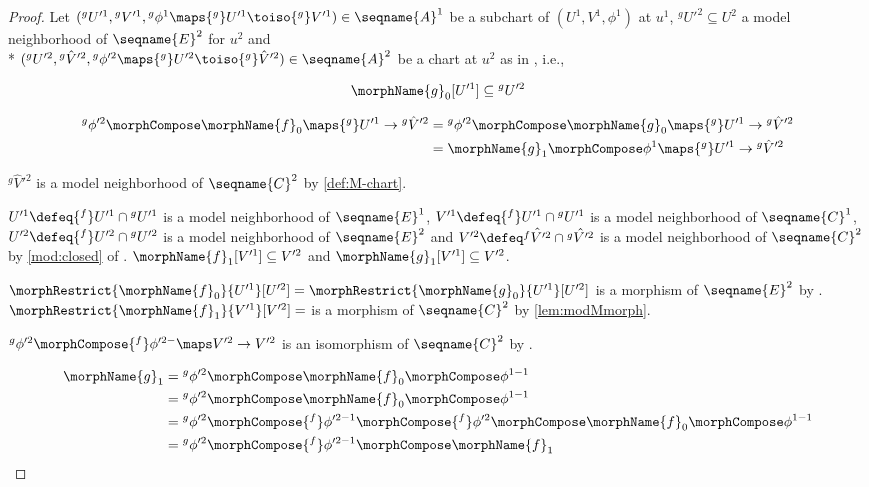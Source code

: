 \documentclass{article}
\begin{document}
\begin{lemma}
\begin{proof}
Let
$
  ({^g}U'^1, {^g}V'^1, {^g}\phi^1 \maps {^g}U'^1 \toiso {^g}V'^1)
  \in \seqname{A}^1
$
be a subchart of $(U^1,V^1,\phi^1)$ at $u^1$,
${^g}U'^2 \subseteq U^2$ a model neighborhood of $\seqname{E}^2$ for
$u^2$ and \\*
$
  ({^g}U'^2 ,{^g}\hat{V}'^2, {^g}\phi'^2 \maps {^g}U'^2 \toiso {^g}\hat{V}'^2)
  \in \seqname{A}^2
$
be a chart at $u^2$  as in , i.e.,

\begin{equation}
\morphName{g}_0[U'^1] \subseteq {^g}U'^2
\end{equation}

\begin{equation}
\begin{split}
  {^g}\phi'^2 \morphCompose \morphName{f}_0 \maps {^g}U'^1 \to {^g}\hat{V}'^2
  & =
  {^g}\phi'^2 \morphCompose \morphName{g}_0 \maps {^g}U'^1 \to {^g}\hat{V}'^2
\\*
  & =
  \morphName{g}_1 \morphCompose \phi^1 \maps {^g}U'^1 \to {^g}\hat{V}'^2
\end{split}
\end{equation}

${^g}\hat{V}'^2$ is a model neighborhood of
$\seqname{C}^2$ by \cref{def:M-chart}.

\nobreaks
  {{
    $U'^1 \defeq {^f}U'^1 \cap {^g}U'^1$
  }}
is a model neighborhood of $\seqname{E}^1$,
\nobreaks
  {{
    $V'^1 \defeq {^f}U'^1 \cap {^g}U'^1$
  }}
is a model neighborhood of $\seqname{C}^1$,
\nobreaks
  {{
    $U'^2 \defeq {^f}U'^2 \cap {^g}U'^2$
  }}
is a model neighborhood of $\seqname{E}^2$ and
\nobreaks
  {{
    $V'^2 \defeq \hat{^{f}V'^2} \cap \hat{^{g}V'^2}$
  }}
is a model neighborhood of $\seqname{C}^2$ by
{
  \showlabelsinline
  \cref{mod:closed}
}
of .
$\morphName{f}_1[V'^1] \subseteq V'^2$ and
$\morphName{g}_1[V'^1] \subseteq V'^2$.

$
  \morphRestrict{\morphName{f}_0}{U'^1}[U'^2] =
  \morphRestrict{\morphName{g}_0}{U'^1}[U'^2]
$
is a morphism of $\seqname{E}^2$ by .
$
  \morphRestrict{\morphName{f}_1}{V'^1}[V'^2] =
$
is a morphism of $\seqname{C}^2$ by \cref{lem:modMmorph}.

${^g}\phi'^2 \morphCompose {^f}\phi'^{2-} \maps V'^2 \to V'^2$ is an
isomorphism of $\seqname{C}^2$ by .

\begin{equation}
\begin{split}
  \morphName{g}_1
   & =
   {^g}\phi'^2 \morphCompose \morphName{f}_0 \morphCompose \phi^{1-1}
\\*
  & =
    {^g}\phi'^2 \morphCompose \morphName{f}_0 \morphCompose \phi^{1-1}
\\*
  & =
    {^g}\phi'^2 \morphCompose {^f}\phi'^{2-1} \morphCompose
    {^f}\phi'^2 \morphCompose \morphName{f}_0 \morphCompose \phi^{1-1}
\\*
  & =
    {^g}\phi'^2 \morphCompose {^f}\phi'^{2-1} \morphCompose
    \morphName{f}_1
\end{split}
\end{equation}


\end{proof}
\end{lemma}
\end{document}
